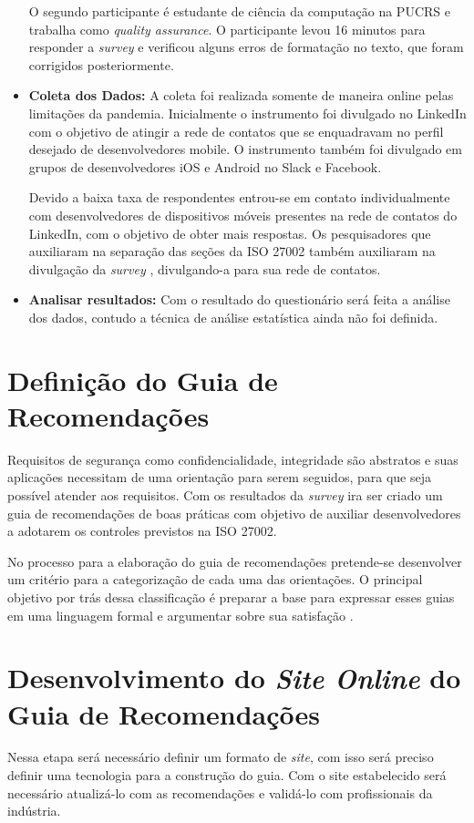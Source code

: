 \begin{itemize}
 O segundo participante é estudante de ciência da computação na PUCRS e trabalha como \textit{quality assurance}. O participante levou 16 minutos para responder a \textit{survey} e verificou alguns erros de formatação no texto, que foram corrigidos posteriormente.  
 

\item \textbf{Coleta dos Dados:} A coleta foi realizada somente de maneira online pelas limitações da pandemia. Inicialmente o instrumento foi divulgado no LinkedIn com o objetivo de atingir a rede de contatos que se enquadravam no perfil desejado de desenvolvedores mobile. O instrumento também foi divulgado em grupos de desenvolvedores iOS e Android no Slack e Facebook. 

Devido a baixa taxa de respondentes entrou-se em contato individualmente com desenvolvedores de dispositivos móveis presentes na rede de contatos do LinkedIn, com o objetivo de obter mais respostas. Os pesquisadores que auxiliaram na separação das seções da ISO 27002 também auxiliaram na divulgação da \textit{survey} , divulgando-a para sua rede de contatos. 

 
\item \textbf{Analisar resultados:} Com o resultado do questionário será feita a análise dos dados, contudo a técnica de análise estatística ainda não foi definida. 
\end{itemize}


\section{\textbf{Definição do Guia de Recomendações}}

Requisitos de segurança como confidencialidade, integridade são abstratos e suas aplicações necessitam de uma orientação para serem seguidos, para que seja possível atender aos requisitos. Com os resultados da \textit{survey} ira ser criado um guia de recomendações de boas práticas com objetivo de auxiliar desenvolvedores a adotarem os controles previstos na ISO 27002. 

No processo para a elaboração do guia de recomendações pretende-se desenvolver um critério para a categorização de cada uma das orientações. O principal objetivo por trás dessa classificação é preparar a base para expressar esses guias em uma linguagem formal e argumentar sobre sua satisfação \cite{zhioua2016security}.

\section{\textbf{Desenvolvimento do \textit{Site Online} do Guia de Recomendações}} 
Nessa etapa será necessário definir um formato de \textit{site}, com isso será preciso definir uma tecnologia para a construção do guia. Com o site estabelecido será necessário atualizá-lo com as recomendações e validá-lo com profissionais da indústria.

